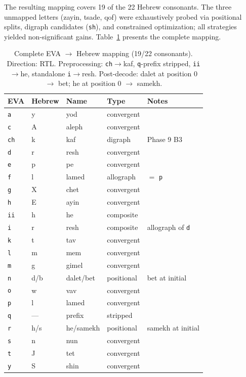 \documentclass[11pt,a4paper]{article}
\newcommand{\eva}[1]{\texttt{#1}}
\newcommand{\heb}[1]{\textsf{#1}}
\begin{document}
The resulting mapping covers 19 of the 22 Hebrew consonants. The three
unmapped letters (zayin, tsade, qof) were exhaustively probed via positional
splits, digraph candidates (\eva{sh}), and constrained optimization; all
strategies yielded non-significant gains. Table~\ref{tab:mapping} presents
the complete mapping.

\begin{table}[htbp]
\centering
\caption{Complete EVA $\to$ Hebrew mapping (19/22 consonants). Direction: RTL.
Preprocessing: \eva{ch}$\to$kaf, \eva{q}-prefix stripped, \eva{ii}$\to$he,
standalone \eva{i}$\to$resh. Post-decode: dalet at position 0 $\to$ bet;
he at position 0 $\to$ samekh.}
\label{tab:mapping}
\small
\begin{tabular}{@{}lllll@{}}
\toprule
EVA & Hebrew & Name & Type & Notes \\
\midrule
\eva{a} & \heb{y} & yod & convergent & \\
\eva{c} & \heb{A} & aleph & convergent & \\
\eva{ch} & \heb{k} & kaf & digraph & Phase 9 B3 \\
\eva{d} & \heb{r} & resh & convergent & \\
\eva{e} & \heb{p} & pe & convergent & \\
\eva{f} & \heb{l} & lamed & allograph & $=$ \eva{p} \\
\eva{g} & \heb{X} & chet & convergent & \\
\eva{h} & \heb{E} & ayin & convergent & \\
\eva{ii} & \heb{h} & he & composite & \\
\eva{i} & \heb{r} & resh & composite & allograph of \eva{d} \\
\eva{k} & \heb{t} & tav & convergent & \\
\eva{l} & \heb{m} & mem & convergent & \\
\eva{m} & \heb{g} & gimel & convergent & \\
\eva{n} & \heb{d}/\heb{b} & dalet/bet & positional & bet at initial \\
\eva{o} & \heb{w} & vav & convergent & \\
\eva{p} & \heb{l} & lamed & convergent & \\
\eva{q} & --- & prefix & stripped & \\
\eva{r} & \heb{h}/\heb{s} & he/samekh & positional & samekh at initial \\
\eva{s} & \heb{n} & nun & convergent & \\
\eva{t} & \heb{J} & tet & convergent & \\
\eva{y} & \heb{S} & shin & convergent & \\
\bottomrule
\end{tabular}
\end{table}
\end{document}
